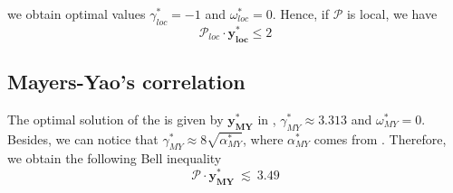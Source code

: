 we obtain optimal values $\gamma_{loc}^* = -1$ and $\omega_{loc}^* = 0 $. Hence, if $\mathcal{P}$ is local, we have 
\begin{equation}
    \mathcal{P}_{loc} \cdot \mathbf{y^*_{loc}} \leq 2 
\end{equation}


\subsection{Mayers-Yao's correlation}

The optimal solution of the  is given by $\mathbf{y^*_{MY}}$ in ,
$\gamma^*_{MY} \approx 3.313 $ and $\omega^*_{MY} =0$. Besides, we can notice that 
$\gamma^*_{MY} \approx 8 \sqrt{\alpha^*_{MY}}$, where $\alpha^*_{MY}$ comes from
.
Therefore, we obtain the following Bell inequality
\begin{equation}
     \mathcal{P} \cdot \mathbf{y^*_{MY}} \ \lesssim \ 3.49
 \end{equation}
 
